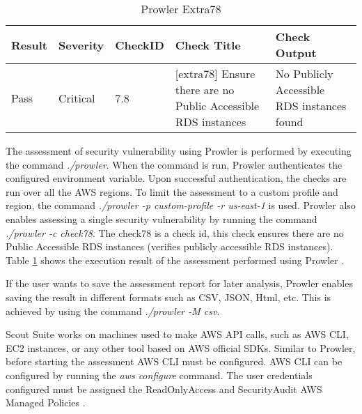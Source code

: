 \begin{table}[h!]
    \begin{center}
        \caption{Prowler Extra78}
        \label{tab:prowlerextra}
        \begin{tabular}{|p{1.4cm}|p{1.7cm}|p{1.5cm}|p{4.0cm}|p{5.0cm}|}
            \hline
            \textbf{Result} & \textbf{Severity} & \textbf{CheckID} & \textbf{Check Title} & \textbf{Check Output}\\
            \hline
            Pass & Critical & 7.8 & [extra78] Ensure there are no Public Accessible RDS instances &
            No Publicly Accessible RDS instances found\\
            \hline
        \end{tabular}
    \end{center}
\end{table}

\par The assessment of security vulnerability using Prowler is performed by executing the command \textit{./prowler}.
When the command is run, Prowler authenticates the configured environment variable.
Upon successful authentication, the checks are run over all the AWS regions.
To limit the assessment to a custom profile and region, the command \textit{./prowler -p custom-profile -r us-east-1} is used.
Prowler also enables assessing a single security vulnerability by running the command \textit{./prowler -c check78}.
The check78 is a check id, this check ensures there are no Public Accessible RDS instances (verifies publicly accessible RDS instances).
Table \ref{tab:prowlerextra} shows the execution result of the assessment performed using Prowler \cite{75}.

\par If the user wants to save the assessment report for later analysis, Prowler enables saving the result in different formats such as CSV, JSON, Html, etc.
This is achieved by using the command \textit{./prowler -M csv}\cite{75}.


\par Scout Suite works on machines used to make AWS API calls, such as AWS CLI, EC2 instances, or any other tool based on AWS official SDKs. Similar to Prowler, before starting the assessment AWS CLI must be configured.
AWS CLI can be configured by running the \textit{aws configure} command.
The user credentials configured must be assigned the ReadOnlyAccess and SecurityAudit AWS Managed Policies \cite{76}.

